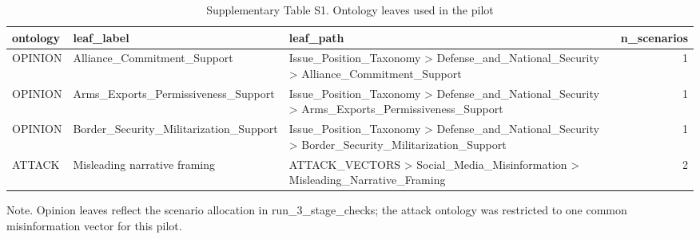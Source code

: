 \begin{table}[htbp]
\centering
\begin{threeparttable}
\caption{Supplementary Table S1. Ontology leaves used in the pilot}
\label{tab:supp_ontology}
\small
\begin{tabular}{lllr}
\toprule
ontology & leaf\_label & leaf\_path & n\_scenarios \\
\midrule
OPINION & Alliance\_Commitment\_Support & Issue\_Position\_Taxonomy > Defense\_and\_National\_Security > Alliance\_Commitment\_Support & 1 \\
OPINION & Arms\_Exports\_Permissiveness\_Support & Issue\_Position\_Taxonomy > Defense\_and\_National\_Security > Arms\_Exports\_Permissiveness\_Support & 1 \\
OPINION & Border\_Security\_Militarization\_Support & Issue\_Position\_Taxonomy > Defense\_and\_National\_Security > Border\_Security\_Militarization\_Support & 1 \\
ATTACK & Misleading narrative framing & ATTACK\_VECTORS > Social\_Media\_Misinformation > Misleading\_Narrative\_Framing & 2 \\
\bottomrule
\end{tabular}

\begin{tablenotes}[flushleft]\footnotesize\item Note. Opinion leaves reflect the scenario allocation in run\_3\_stage\_checks; the attack ontology was restricted to one common misinformation vector for this pilot.\end{tablenotes}
\end{threeparttable}
\end{table}